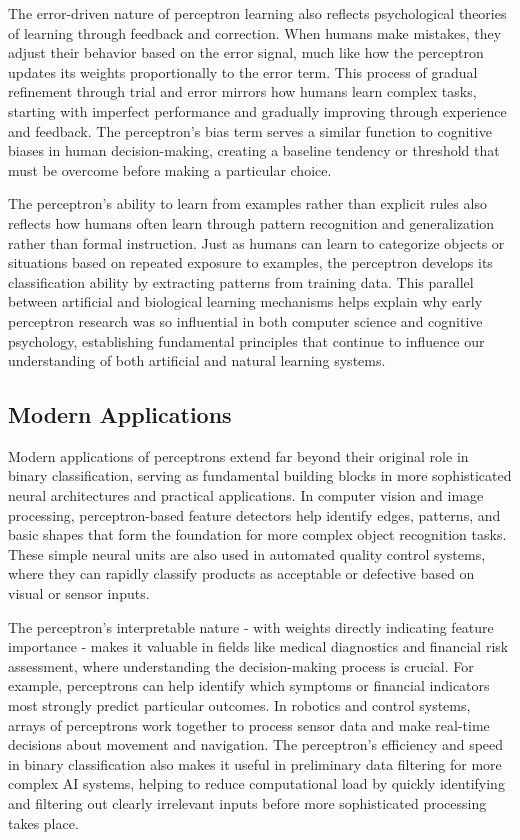 The error-driven nature of perceptron learning also reflects psychological theories of learning through feedback and correction. When humans make mistakes, they adjust their behavior based on the error signal, much like how the perceptron updates its weights proportionally to the error term. This process of gradual refinement through trial and error mirrors how humans learn complex tasks, starting with imperfect performance and gradually improving through experience and feedback. The perceptron's bias term serves a similar function to cognitive biases in human decision-making, creating a baseline tendency or threshold that must be overcome before making a particular choice.

The perceptron's ability to learn from examples rather than explicit rules also reflects how humans often learn through pattern recognition and generalization rather than formal instruction. Just as humans can learn to categorize objects or situations based on repeated exposure to examples, the perceptron develops its classification ability by extracting patterns from training data. This parallel between artificial and biological learning mechanisms helps explain why early perceptron research was so influential in both computer science and cognitive psychology, establishing fundamental principles that continue to influence our understanding of both artificial and natural learning systems.

\subsection{Modern Applications}
Modern applications of perceptrons extend far beyond their original role in binary classification, serving as fundamental building blocks in more sophisticated neural architectures and practical applications. In computer vision and image processing, perceptron-based feature detectors help identify edges, patterns, and basic shapes that form the foundation for more complex object recognition tasks. These simple neural units are also used in automated quality control systems, where they can rapidly classify products as acceptable or defective based on visual or sensor inputs.

The perceptron's interpretable nature - with weights directly indicating feature importance - makes it valuable in fields like medical diagnostics and financial risk assessment, where understanding the decision-making process is crucial. For example, perceptrons can help identify which symptoms or financial indicators most strongly predict particular outcomes. In robotics and control systems, arrays of perceptrons work together to process sensor data and make real-time decisions about movement and navigation. The perceptron's efficiency and speed in binary classification also makes it useful in preliminary data filtering for more complex AI systems, helping to reduce computational load by quickly identifying and filtering out clearly irrelevant inputs before more sophisticated processing takes place.

